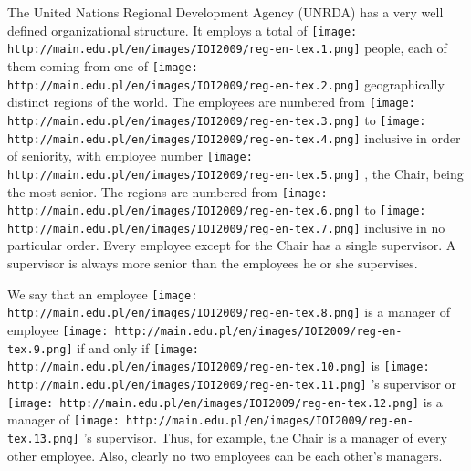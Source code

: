 



   The United Nations Regional Development Agency (UNRDA) has a very well defined organizational structure. It employs a total of   
\texttt{[image: http://main.edu.pl/en/images/IOI2009/reg-en-tex.1.png]}   people, each of them coming from one of   
\texttt{[image: http://main.edu.pl/en/images/IOI2009/reg-en-tex.2.png]}   geographically distinct regions of the world. The employees are numbered from   
\texttt{[image: http://main.edu.pl/en/images/IOI2009/reg-en-tex.3.png]}   to   
\texttt{[image: http://main.edu.pl/en/images/IOI2009/reg-en-tex.4.png]}   inclusive in order of seniority, with employee number   
\texttt{[image: http://main.edu.pl/en/images/IOI2009/reg-en-tex.5.png]}   , the Chair, being the most senior. The regions are numbered from   
\texttt{[image: http://main.edu.pl/en/images/IOI2009/reg-en-tex.6.png]}   to   
\texttt{[image: http://main.edu.pl/en/images/IOI2009/reg-en-tex.7.png]}   inclusive in no particular order. Every employee except for the Chair  has a single supervisor. A supervisor is always more senior than the  employees he or she supervises.  

   We say that an employee   
\texttt{[image: http://main.edu.pl/en/images/IOI2009/reg-en-tex.8.png]}   is a manager of employee   
\texttt{[image: http://main.edu.pl/en/images/IOI2009/reg-en-tex.9.png]}   if and only if   
\texttt{[image: http://main.edu.pl/en/images/IOI2009/reg-en-tex.10.png]}   is   
\texttt{[image: http://main.edu.pl/en/images/IOI2009/reg-en-tex.11.png]}   's supervisor or   
\texttt{[image: http://main.edu.pl/en/images/IOI2009/reg-en-tex.12.png]}   is a manager of   
\texttt{[image: http://main.edu.pl/en/images/IOI2009/reg-en-tex.13.png]}   's  supervisor. Thus, for example, the Chair is a manager of every other  employee. Also, clearly no two employees can be each other's managers.  

